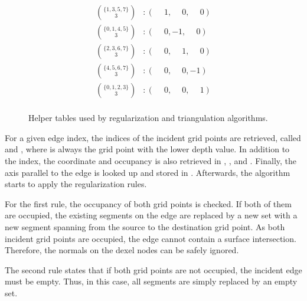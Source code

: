 \begin{figure}
\begin{subfigure}[t]{0.4\textwidth}
\begin{align*}
			\binom{\{1, 3, 5, 7\}}{3} &\colon (\phantom{-}1,\phantom{-}0,\phantom{-}0) \\
			\binom{\{0, 1, 4, 5\}}{3} &\colon (\phantom{-}0,         - 1,\phantom{-}0) \\
			\binom{\{2, 3, 6, 7\}}{3} &\colon (\phantom{-}0,\phantom{-}1,\phantom{-}0) \\
			\binom{\{4, 5, 6, 7\}}{3} &\colon (\phantom{-}0,\phantom{-}0,         - 1) \\
			\binom{\{0, 1, 2, 3\}}{3} &\colon (\phantom{-}0,\phantom{-}0,\phantom{-}1) \\
		\end{align*}
	\end{subfigure}
	\caption{
		Helper tables used by regularization and triangulation algorithms.
	}
	\label{fig:tri_dexel_tables}
\end{figure}
%
For a given edge index, the indices of the incident grid points are retrieved, called  and , where  is always the grid point with the lower depth value.
In addition to the index, the coordinate and occupancy is also retrieved in , ,  and .
Finally, the axis parallel to the edge is looked up and stored in .
Afterwards, the algorithm starts to apply the regularization rules.

For the first rule, the occupancy of both grid points is checked.
If both of them are occupied, the existing segments on the edge are replaced by a new set with a new segment spanning from the source to the destination grid point.
As both incident grid points are occupied, the edge cannot contain a surface intersection.
Therefore, the normals on the dexel nodes can be safely ignored.

The second rule states that if both grid points are not occupied, the incident edge must be empty.
Thus, in this case, all segments are simply replaced by an empty set.

